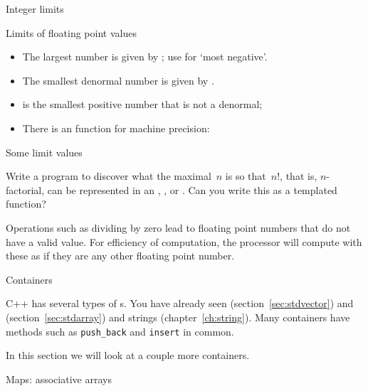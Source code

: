 \begin{block}{Integer limits}
\end{block}

\begin{block}{Limits of floating point values}
  \label{sl:float-limits}
  \begin{itemize}
  \item The largest number is given by ;
    use  for `most negative'.
  \item The smallest denormal number is given by .
  \item {} is the smallest positive number
    that is not a denormal;
  \item There is an  function for machine precision:
  \end{itemize}
\end{block}

\begin{block}{Some limit values}
  \label{sl:ieee-limits}
    \def\codesize{\ttfamily\scriptsize}
\end{block}

\begin{exercise}
  \label{ex:big-factorial}
  Write a program to discover what the maximal~$n$ is so that~$n!$,
  that is, $n$-factorial, can be represented in an , ,
  or . Can you write this as a templated function?
\end{exercise}

Operations such as dividing by zero lead to floating point numbers
that do not have a valid value. For efficiency of computation, the
processor will compute with these as if they are any other floating
point number.


 {Containers}

C++ has several types of s.
You have already seen 
(section~\ref{sec:stdvector})
and 
(section~\ref{sec:stdarray})
and strings (chapter~\ref{ch:string}).
Many containers have 
methods such as \lstinline{push_back} and \lstinline{insert} in common.

In this section we will look at a couple more containers.

 {Maps: associative arrays}
\label{sec:map}

